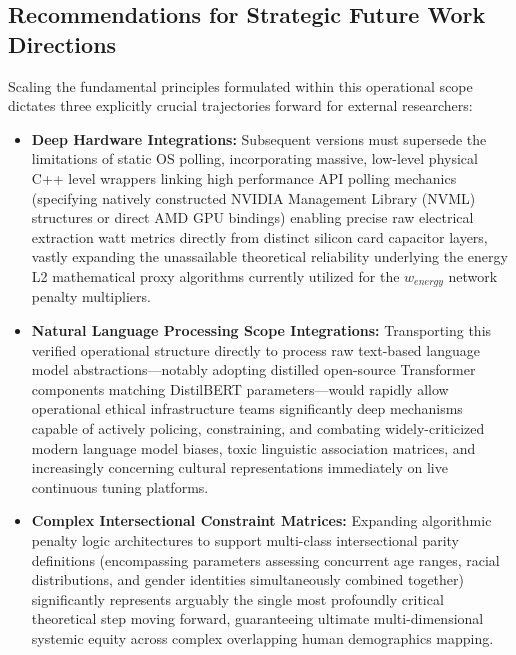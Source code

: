 \documentclass[12pt,a4paper]{article}
\begin{document}
\subsection{Recommendations for Strategic Future Work Directions}
Scaling the fundamental principles formulated within this operational scope dictates three explicitly crucial trajectories forward for external researchers:
\begin{itemize}
    \item \textbf{Deep Hardware Integrations:} Subsequent versions must supersede the limitations of static OS polling, incorporating massive, low-level physical C++ level wrappers linking high performance API polling mechanics (specifying natively constructed NVIDIA Management Library (NVML) structures or direct AMD GPU bindings) enabling precise raw electrical extraction watt metrics directly from distinct silicon card capacitor layers, vastly expanding the unassailable theoretical reliability underlying the energy L2 mathematical proxy algorithms currently utilized for the $w_{energy}$ network penalty multipliers.
    \item \textbf{Natural Language Processing Scope Integrations:} Transporting this verified operational structure directly to process raw text-based language model abstractions—notably adopting distilled open-source Transformer components matching DistilBERT parameters—would rapidly allow operational ethical infrastructure teams significantly deep mechanisms capable of actively policing, constraining, and combating widely-criticized modern language model biases, toxic linguistic association matrices, and increasingly concerning cultural representations immediately on live continuous tuning platforms.
    \item \textbf{Complex Intersectional Constraint Matrices:} Expanding algorithmic penalty logic architectures to support multi-class intersectional parity definitions (encompassing parameters assessing concurrent age ranges, racial distributions, and gender identities simultaneously combined together) significantly represents arguably the single most profoundly critical theoretical step moving forward, guaranteeing ultimate multi-dimensional systemic equity across complex overlapping human demographics mapping.
\end{itemize}
\end{document}
